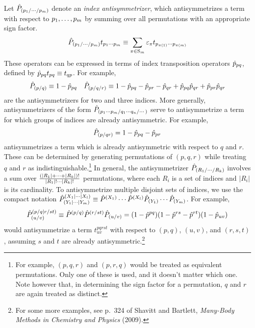 \documentclass[11pt]{article}
\numberwithin{equation}{section}
\begin{document}
\begin{dfn}
Let $\hat{P}_{(p_1/\cdots/p_m)}$ denote an \textit{index antisymmetrizer}, which antisymmetrizes a term with respect to $p_1,\ldots,p_m$ by summing over all permutations with an appropriate sign factor.
\begin{align*}
  \op{P}_{(p_1/\cd/p_m)}
  t_{p_1\cd p_m}
\equiv
  \sum_{\pi\in\mr{S}_m}
  \e_\pi
  t_{p_{\pi(1)}\cd p_{\pi(m)}}
\end{align*}
These operators can be expressed in terms of index transposition operators $\hat{p}_{pq}$, defined by $\hat{p}_{pq}t_{pq}\equiv t_{qp}$.
For example,
\begin{align*}
  \hat{P}_{(p/q)}
\equiv
  1
-
  \hat{p}_{pq}
&&
  \hat{P}_{(p/q/r)}
\equiv
  1
-
  \hat{p}_{pq}
-
  \hat{p}_{pr}
-
  \hat{p}_{qr}
+
  \hat{p}_{pq}\hat{p}_{qr}
+
  \hat{p}_{pr}\hat{p}_{qr}
\end{align*}
are the antisymmetrizers for two and three indices.
More generally, antisymmetrizers of the form $\hat{P}_{(p_1\cdots p_{m}/q_1\cdots q_{n}/\cdots)}$ serve to antisymmetrize a term for which groups of indices are already antisymmetric.
For example,
\begin{align*}
  \hat{P}_{(p/qr)}
=
  1
-
  \hat{p}_{pq}
-
  \hat{p}_{pr}
\end{align*}
antisymmetrizes a term which is already antisymmetric with respect to $q$ and $r$.
These can be determined by generating permutations of $(p,q,r)$ while treating $q$ and $r$ as indistinguishable.\footnote{For example, $(p,q,r)$ and $(p,r,q)$ would be treated as equivalent permutations. Only one of these is used, and it doesn't matter which one.  Note however that, in determining the sign factor for a permutation, $q$ and $r$ are again treated as distinct.}
In general, the antisymmetrizer $\hat{P}_{(R_1/\cdots/R_k)}$ involves a sum over
$
  \frac {
    (|R_1|+\cdots+|R_k|)!
  }{
    |R_1|!\cdots|R_k|!
  }
$
permutations, where each $R_i$ is a set of indices and $|R_i|$ is its cardinality.
To antisymmetrize multiple disjoint sets of indices, we use the compact notation
$
  \hat{P}^{(X_1|\cdots|X_l)}_{(Y_1|\cdots|Y_m)}
\equiv
  \hat{P}^{(X_1)}\cdots \hat{P}^{(X_l)}
  \hat{P}_{(Y_1)}\cdots \hat{P}_{(Y_m)}
$.
For example,
\begin{align}
  \hat{P}^{(p/q|r/st)}_{(u/v)}
\equiv
  \hat{P}^{(p/q)}
  \hat{P}^{(r/st)}
  \hat{P}_{(u/v)}
=
  (1 - \hat{p}^{pq})
  (1 - \hat{p}^{rs} - \hat{p}^{rt})
  (1 - \hat{p}_{uv})
\end{align}
would antisymmetrize a term $t^{pqrst}_{uv}$ with respect to $(p,q)$, $(u,v)$, and $(r,s,t)$, assuming $s$ and $t$ are already antisymmetric.\footnote{For some more examples, see p.~324 of Shavitt and Bartlett, \textit{Many-Body Methods in Chemistry and Physics} (2009).}
\end{dfn}
\end{document}
